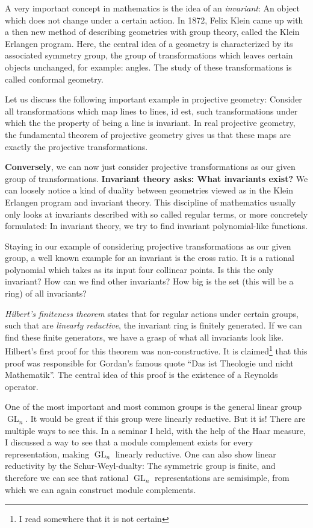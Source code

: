 A very important concept in mathematics is the idea of an \textit{invariant}:
An object which does not change under a certain action.
In 1872, Felix Klein came up with a then new method of describing geometries with group theory, called the Klein Erlangen program.
Here, the central idea of a geometry is characterized by its associated symmetry group, the group of transformations which leaves certain objects unchanged, for example: angles.
The study of these transformations is called conformal geometry.

Let us discuss the following important example in projective geometry:
Consider all transformations which map lines to lines, id est, such transformations under which the the property of being a line is invariant.
In real projective geometry, the fundamental theorem of projective geometry gives us that these maps are exactly the projective transformations.

\textbf{Conversely}, we can now just consider projective transformations as our given group of transformations.
\textbf{Invariant theory asks: What invariants exist?}
We can loosely notice a kind of duality between geometries viewed as in the Klein Erlangen program and invariant theory.
This discipline of mathematics usually only looks at invariants described with so called regular terms, or more concretely formulated:  In invariant theory, we try to find invariant polynomial-like functions.

Staying in our example of considering projective transformations as our given group, a well known example for an invariant is the cross ratio.
It is a rational polynomial which takes as its input four collinear points.
Is this the only invariant?
How can we find other invariants?
How big is the set (this will be a ring) of all invariants?

\textit{Hilbert's finiteness theorem} states that for regular actions under certain groups, such that are \textit{linearly reductive}, the invariant ring is finitely generated.
If we can find these finite generators, we have a grasp of what all invariants look like.
Hilbert's first proof for this theorem was non-constructive.
It is claimed\footnote{I read somewhere that it is not certain} that this proof was responsible for Gordan's famous quote ``Das ist Theologie und nicht Mathematik''.
The central idea of this proof is the existence of a Reynolds operator.

One of the most important and most common groups is the general linear group $\operatorname{GL}_n$.
It would be great if this group were linearly reductive.
But it is!
There are multiple ways to see this.
In a seminar I held, with the help of the Haar measure, I discussed a way to see that a module complement exists for every representation, making $\operatorname{GL}_n$ linearly reductive.
One can also show linear reductivity by the Schur-Weyl-dualty:  The symmetric group is finite, and therefore we can see that rational $\operatorname{GL}_n$ representations are semisimple, from which we can again construct module complements.


